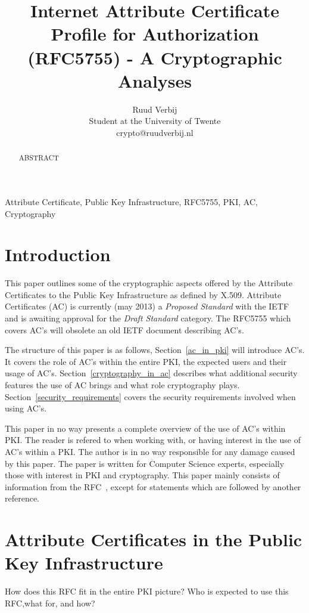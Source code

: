 \documentclass[10pt,conference,a4paper]{IEEEtran}
\title{Internet Attribute Certificate Profile for Authorization (RFC5755) - A Cryptographic Analyses}
\author{Ruud Verbij \\ Student at the University of Twente \\ crypto@ruudverbij.nl}
\begin{document}
\maketitle

\begin{abstract}
ABSTRACT
\end{abstract}

\begin{IEEEkeywords}
Attribute Certificate, Public Key Infrastructure, RFC5755, PKI, AC, Cryptography
\end{IEEEkeywords}

\label{Introduction}
\section{Introduction}
This paper outlines some of the cryptographic aspects offered by the Attribute Certificates\cite{rfc_ac} to the Public Key Infrastructure as defined by X.509\cite{rfc_x509}. Attribute Certificates (AC) is currently (may 2013) a \textit{Proposed Standard} with the IETF and is awaiting approval for the \textit{Draft Standard} category. The RFC5755 which covers AC's will obsolete an old IETF document describing AC's\cite{rfc_oldac}.

The structure of this paper is as follows, Section~\ref{ac_in_pki} will introduce AC's. It covers the role of AC's within the entire PKI, the expected users and their usage of AC's. Section~\ref{cryptography_in_ac} describes what additional security features the use of AC brings and what role cryptography plays. Section~\ref{security_requirements} covers the security requirements involved when using AC's.  

This paper in no way presents a complete overview of the use of AC's within PKI. The reader is refered to \cite{rfc_ac} when working with, or having interest in the use of AC's within a PKI. The author is in no way responsible for any damage caused by this paper. The paper is written for Computer Science experts, especially those with interest in PKI and cryptography. This paper mainly consists of information from the RFC~\cite{rfc_ac}, except for statements which are followed by another reference.

\label{ac_in_pki}
\section{Attribute Certificates in the Public Key Infrastructure}
How does this RFC fit in the entire PKI picture? Who is expected to use this RFC,what for, and how?
\end{document}

